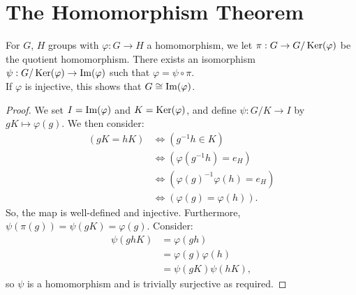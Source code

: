 \section{The Homomorphism Theorem}

For $G$, $H$ groups with $\varphi : G \to H$ a homomorphism, we let 
$\pi : G \to G / \operatorname{Ker}(\varphi)$ be the quotient homomorphism.
There exists an isomorphism $\psi : G / \operatorname{Ker}(\varphi) \to \operatorname{Im}(\varphi)$
such that $\varphi = \psi \circ \pi$.
\\[\baselineskip]
If $\varphi$ is injective, this shows that $G \cong \operatorname{Im}(\varphi)$.

\begin{proof}
    We set $I = \operatorname{Im}(\varphi)$ and $K = \operatorname{Ker}(\varphi)$, and define 
    $\psi : G / K \to I$ by $gK \mapsto \varphi(g)$. We then consider:
    \begin{align*}
        (gK = hK) &\Longleftrightarrow (g^{-1}h \in K) \\
        &\Longleftrightarrow (\varphi(g^{-1}h) = e_H) \\
        &\Longleftrightarrow (\varphi(g)^{-1}\varphi(h) = e_H) \\
        &\Longleftrightarrow (\varphi(g) = \varphi(h)).
    \end{align*} So, the map is well-defined and injective.
    Furthermore, $\psi(\pi(g)) = \psi(gK) = \varphi(g)$.
    Consider: \begin{align*}
        \psi(ghK) &= \varphi(gh) \\
        &= \varphi(g)\varphi(h) \\
        &= \psi(gK)\psi(hK),
    \end{align*} so $\psi$ is a homomorphism and is 
    trivially surjective as required.
\end{proof}
